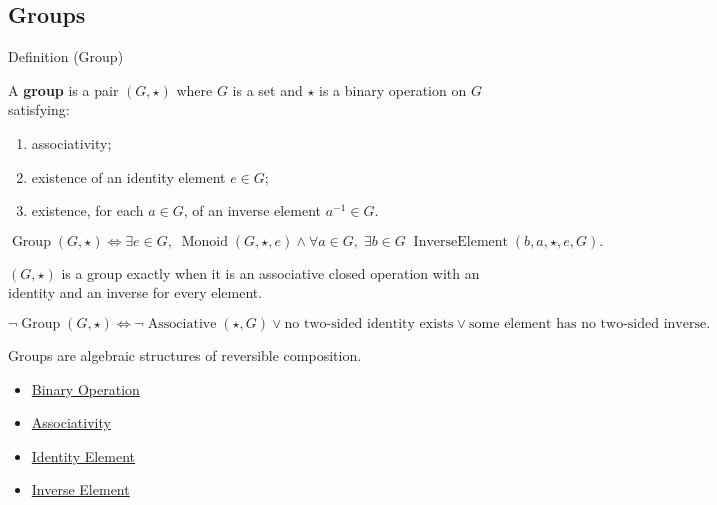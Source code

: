 \subsection*{Groups}
\label{subsec:groups}

\begin{definitionbox}{Definition (Group)}
\begin{definition}[Group]
\label{def:algebraic-group}
A \textbf{group} is a pair $(G,\star)$ where $G$ is a set and $\star$ is a
binary operation on $G$ satisfying:
\begin{enumerate}[label=\textbf{G\arabic*.}]
  \item associativity;
  \item existence of an identity element $e\in G$;
  \item existence, for each $a\in G$, of an inverse element $a^{-1}\in G$.
\end{enumerate}
\end{definition}
\end{definitionbox}

\begin{remark*}
\[
\operatorname{Group}(G,\star)
\Longleftrightarrow
\exists e\in G,\;
\operatorname{Monoid}(G,\star,e)
\land
\forall a\in G,\;\exists b\in G\;
\operatorname{InverseElement}(b,a,\star,e,G).
\]
\end{remark*}

\begin{remark*}
$(G,\star)$ is a group exactly when it is an associative closed operation with
an identity and an inverse for every element.
\end{remark*}

\begin{remark*}
\[
\neg\operatorname{Group}(G,\star)
\Longleftrightarrow
\neg\operatorname{Associative}(\star,G)
\lor
\text{no two-sided identity exists}
\lor
\text{some element has no two-sided inverse}.
\]
\end{remark*}

\begin{remark*}[Interpretation]
Groups are algebraic structures of reversible composition.
\end{remark*}

\begin{dependencies}
\begin{itemize}
  \item \hyperref[def:binary-operation]{Binary Operation}
  \item \hyperref[def:algebraic-associativity]{Associativity}
  \item \hyperref[def:identity-element]{Identity Element}
  \item \hyperref[def:inverse-element]{Inverse Element}
\end{itemize}
\end{dependencies}


